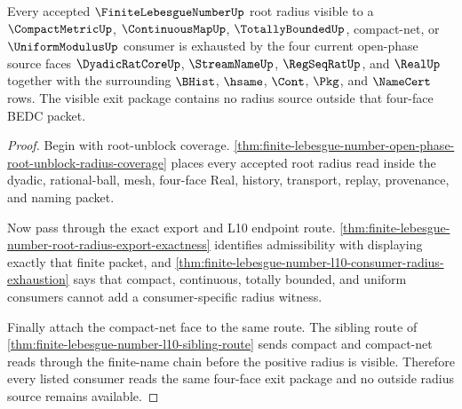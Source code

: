\begin{theorem}
\label{thm:finite-lebesgue-number-four-face-radius-exit-coverage}
Every accepted $\FiniteLebesgueNumberUp$ root radius visible to a $\CompactMetricUp$, $\ContinuousMapUp$, $\TotallyBoundedUp$, compact-net, or $\UniformModulusUp$ consumer is exhausted by the four current open-phase source faces $\DyadicRatCoreUp$, $\StreamNameUp$, $\RegSeqRatUp$, and $\RealUp$ together with the surrounding $\BHist$, $\hsame$, $\Cont$, $\Pkg$, and $\NameCert$ rows. The visible exit package contains no radius source outside that four-face BEDC packet.
\end{theorem}
\begin{proof}
Begin with root-unblock coverage. \autoref{thm:finite-lebesgue-number-open-phase-root-unblock-radius-coverage} places every accepted root radius read inside the dyadic, rational-ball, mesh, four-face Real, history, transport, replay, provenance, and naming packet.

Now pass through the exact export and L10 endpoint route. \autoref{thm:finite-lebesgue-number-root-radius-export-exactness} identifies admissibility with displaying exactly that finite packet, and \autoref{thm:finite-lebesgue-number-l10-consumer-radius-exhaustion} says that compact, continuous, totally bounded, and uniform consumers cannot add a consumer-specific radius witness.

Finally attach the compact-net face to the same route. The sibling route of \autoref{thm:finite-lebesgue-number-l10-sibling-route} sends compact and compact-net reads through the finite-name chain before the positive radius is visible. Therefore every listed consumer reads the same four-face exit package and no outside radius source remains available.
\end{proof}

